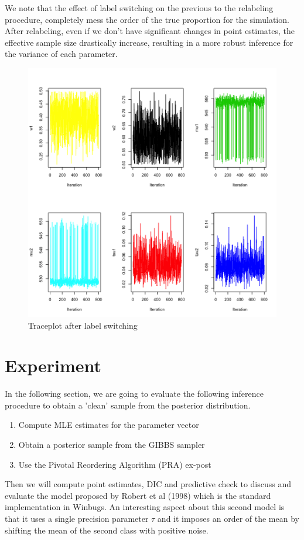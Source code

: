 \documentclass{article}
\begin{document}
We note that the effect of label switching on the previous to the relabeling procedure, completely mess the order of the true proportion for the simulation. After relabeling, even if we don't have significant changes in point estimates, the effective sample size drastically increase, resulting in a more robust inference for the variance of each parameter.

\begin{figure}[h!]
    \centering
    \includegraphics[width=.7\textwidth]{plot_4.png}
    \caption{Traceplot after label switching}
    \label{Monkey measurement}
\end{figure}

\section{Experiment}
In the following section, we are going to evaluate the following inference procedure to obtain a 'clean' sample from the posterior distribution.
\begin{enumerate}
\item Compute MLE estimates for the parameter vector
\item Obtain a posterior sample from the GIBBS sampler
\item Use the Pivotal Reordering Algorithm (PRA) ex-post
\end{enumerate}
Then we will compute point estimates, DIC and predictive check to discuss and evaluate the model proposed by Robert et al (1998) which is the standard implementation in Winbugs. An interesting aspect about this second model is that it uses a single precision parameter $\tau$ and it imposes an order of the mean by shifting the mean of the second class with positive noise.
\end{document}
